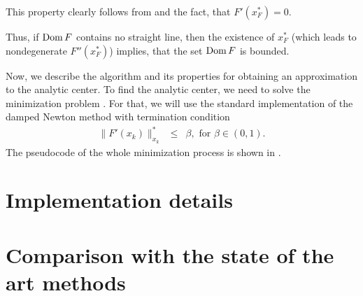 This property clearly follows from  and the fact, that $F'(x^*_F) = 0$.

Thus, if $\operatorname{Dom} F$ contains no straight line, then the existence of $x^*_F$ (which leads to nondegenerate $F''(x^*_F)$) implies, that the set $\operatorname{Dom} F$ is bounded.

Now, we describe the algorithm and its properties for obtaining an approximation to the analytic center.
To find the analytic center, we need to solve the minimization problem .
For that, we will use the standard implementation of the damped Newton method with termination condition
\begin{eqnarray}
  \|F'(x_k)\|^*_{x_k} &\leq& \beta, \text{ for } \beta\in(0,1).
\end{eqnarray}
The pseudocode of the whole minimization process is shown in .



\section{Implementation details}

\section{Comparison with the state of the art methods}


